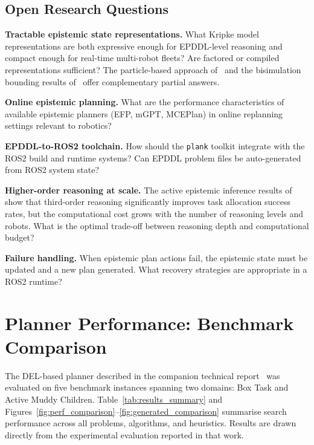 \documentclass[12pt,a4paper]{article}
\theoremstyle{definition}
\theoremstyle{plain}
\begin{document}
\subsection{Open Research Questions}

\textbf{Tractable epistemic state representations.} What Kripke model representations are both
expressive enough for EPDDL-level reasoning and compact enough for real-time multi-robot fleets?
Are factored or compiled representations sufficient? The particle-based approach
of~\cite{bramblett2023frontiers} and the bisimulation bounding results of~\cite{lowe2010planning}
offer complementary partial answers.

\textbf{Online epistemic planning.} What are the performance characteristics of available
epistemic planners (EFP, mGPT, MCEPlan) in online replanning settings relevant to robotics?

\textbf{EPDDL-to-ROS2 toolchain.} How should the \texttt{plank} toolkit integrate with the ROS2
build and runtime systems? Can EPDDL problem files be auto-generated from ROS2 system state?

\textbf{Higher-order reasoning at scale.} The active epistemic inference results
of~\cite{bramblett2025active} show that third-order reasoning significantly improves task
allocation success rates, but the computational cost grows with the number of reasoning levels
and robots. What is the optimal trade-off between reasoning depth and computational budget?

\textbf{Failure handling.} When epistemic plan actions fail, the epistemic state must be updated
and a new plan generated. What recovery strategies are appropriate in a ROS2 runtime?


\newpage
\section{Planner Performance: Benchmark Comparison}
\label{sec:benchmark_comparison}

The DEL-based planner described in the companion technical report~\cite{ulises2026del}
was evaluated on five benchmark instances spanning two domains: Box Task and Active Muddy
Children. Table~\ref{tab:results_summary} and Figures~\ref{fig:perf_comparison}--\ref{fig:generated_comparison}
summarise search performance across all problems, algorithms, and heuristics. Results are
drawn directly from the experimental evaluation reported in that work.
\end{document}
